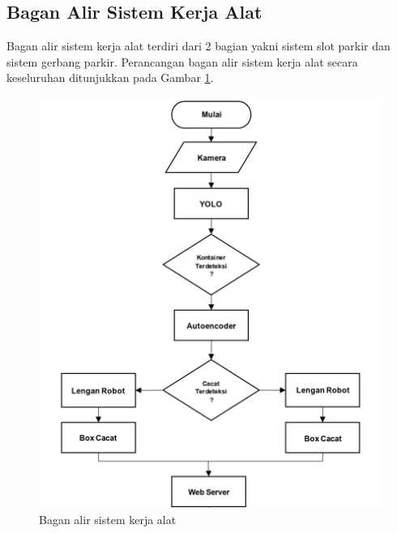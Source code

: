 \vspace{1em}

\subsection{Bagan Alir Sistem Kerja Alat}
Bagan alir sistem kerja alat terdiri dari 2 bagian yakni sistem slot
parkir dan sistem gerbang parkir. Perancangan bagan alir sistem kerja
alat secara keseluruhan ditunjukkan pada Gambar \ref{fig:bagan-alir-kerja}.

\begin{figure}[H]
  \centering
  \includegraphics[]{gambar/flowchart.jpg}
  \caption{Bagan alir sistem kerja alat}
  \label{fig:bagan-alir-kerja}
\end{figure}
\vspace{-1em}
